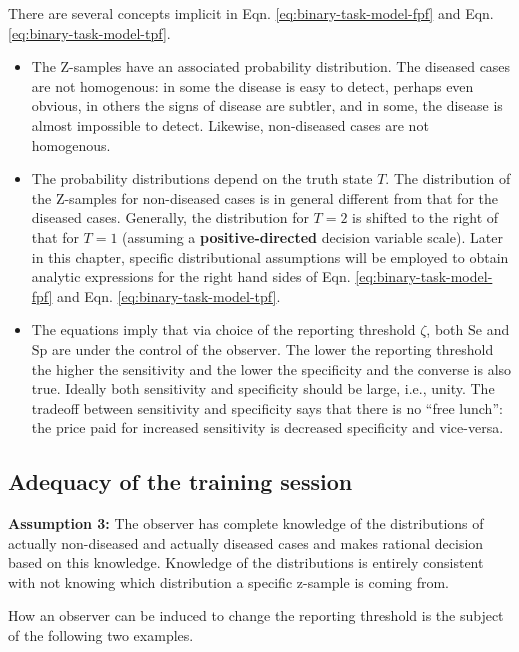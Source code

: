 \documentclass[
]{book}
\begin{document}
There are several concepts implicit in Eqn. \eqref{eq:binary-task-model-fpf} and Eqn. \eqref{eq:binary-task-model-tpf}.

\begin{itemize}
\item
  The Z-samples have an associated probability distribution. The diseased cases are not homogenous: in some the disease is easy to detect, perhaps even obvious, in others the signs of disease are subtler, and in some, the disease is almost impossible to detect. Likewise, non-diseased cases are not homogenous.
\item
  The probability distributions depend on the truth state \(T\). The distribution of the Z-samples for non-diseased cases is in general different from that for the diseased cases. Generally, the distribution for \(T = 2\) is shifted to the right of that for \(T = 1\) (assuming a \textbf{positive-directed} decision variable scale). Later in this chapter, specific distributional assumptions will be employed to obtain analytic expressions for the right hand sides of Eqn. \eqref{eq:binary-task-model-fpf} and Eqn. \eqref{eq:binary-task-model-tpf}.
\item
  The equations imply that via choice of the reporting threshold \(\zeta\), both \(\text{Se}\) and \(\text{Sp}\) are under the control of the observer. The lower the reporting threshold the higher the sensitivity and the lower the specificity and the converse is also true. Ideally both sensitivity and specificity should be large, i.e., unity. The tradeoff between sensitivity and specificity says that there is no ``free lunch'': the price paid for increased sensitivity is decreased specificity and vice-versa.
\end{itemize}

\hypertarget{adequacy-of-the-training-session}{%
\subsection{Adequacy of the training session}\label{adequacy-of-the-training-session}}

\textbf{Assumption 3:} The observer has complete knowledge of the distributions of actually non-diseased and actually diseased cases and makes rational decision based on this knowledge. Knowledge of the distributions is entirely consistent with not knowing which distribution a specific z-sample is coming from.

How an observer can be induced to change the reporting threshold is the subject of the following two examples.
\end{document}
